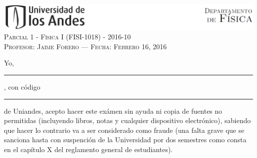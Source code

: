 \documentclass[letterpaper,10pt,onecolumn]{article}
\begin{document}
\thispagestyle{empty}
\begin{center}

\includegraphics[width=490pt]{figs/header.png}\\[0.5cm]

\textsc{\LARGE Parcial 1 - F\'isica I (FISI-1018) - 2016-10}\\[0.5cm]

\textsc{\Large{Profesor: Jaime Forero --- Fecha: Febrero 16, 2016}} \\[0.5cm]
\end{center}

Yo, \rule{10cm}{0.4pt}, con c\'odigo \rule{4cm}{0.4pt} de Uniandes,
acepto hacer este ex\'amen sin ayuda ni copia de fuentes no
permitidas (incluyendo libros, notas y cualquier dispositivo
electr\'onico),  sabiendo que hacer lo contrario va a ser considerado
como fraude (una falta grave que se sanciona hasta con suspenci\'on de la Universidad por
dos semestres como consta en el cap\'itulo X del reglamento general de
estudiantes). 
\end{document}
